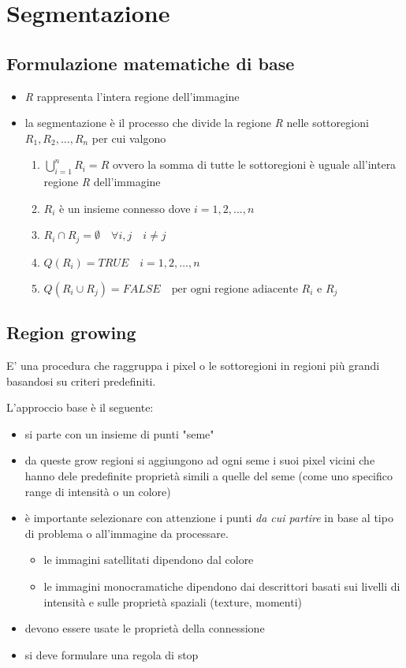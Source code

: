 \chapter{Segmentazione}

\section{Formulazione matematiche di base}

\begin{itemize}
	\item \textit{R} rappresenta l'intera regione dell'immagine
	\item la segmentazione è il processo che divide la regione \textit{R} nelle sottoregioni $R_1, R_2, \dots, R_n$ per cui valgono
	\begin{enumerate}
		\item $\bigcup_{i=1}^{n} R_i = R$ \quad ovvero la somma di tutte le sottoregioni è uguale all'intera regione \textit{R} dell'immagine
		
		\item $R_i$ è un insieme \gls{connesso} dove $i = 1, 2, \dots, n$
		\item $R_i \cap R_j = \emptyset \quad \forall i,j \quad i \neq j$
		\item $Q(R_i) = TRUE \quad i = 1, 2, \dots, n$
		\item $Q(R_i \cup R_j) = FALSE \quad \text{per ogni regione adiacente } R_i$ e $R_j$
	\end{enumerate}
\end{itemize}

\section{Region growing}
E' una procedura che raggruppa i pixel o le sottoregioni in regioni più grandi basandosi su criteri predefiniti.

L'approccio base è il seguente:

\begin{itemize}
	\item si parte con un insieme di punti "seme"
	\item da queste grow regioni si aggiungono ad ogni seme i suoi pixel vicini che hanno dele predefinite proprietà simili a quelle del seme (come uno specifico range di intensità o un colore)
	\item è importante selezionare con attenzione i punti \textit{da cui partire} in base al tipo di problema o all'immagine da processare.
	\begin{itemize}
			\item le immagini satellitati dipendono dal colore
			\item le immagini monocramatiche dipendono dai descrittori basati sui livelli di intensità e sulle proprietà spaziali (texture, momenti)
	\end{itemize}
	
	\item devono essere usate le proprietà della connessione
	\item si deve formulare una regola di stop
\end{itemize}

